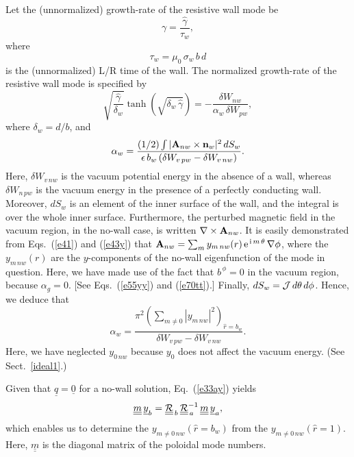 \documentclass[12pt,prb,aps]{revtex4-1}
\begin{document}
 Let the (unnormalized) 
 growth-rate of the resistive wall mode be
 \begin{equation}
 \gamma= \frac{\hat{\gamma}}{\tau_w},
 \end{equation}
 where
 \begin{equation}
 \tau_w = \mu_0\,\sigma_w\,b\,d
 \end{equation}
 is the (unnormalized) L/R time of the wall. 
 The normalized growth-rate of the resistive wall mode is specified by\,\cite{rwm4,rwm5}
 \begin{equation}\label{rwm}
 \sqrt{\frac{\hat{\gamma}}{\delta_w}}\tanh\left(\sqrt{\delta_w\,\hat{\gamma}}\right) = -\frac{\delta W_{nw}}{\alpha_w\,\delta W_{pw}},
 \end{equation}
 where $\delta_w=d/b$, 
and
 \begin{equation}
 \alpha_w = \frac{(1/2)\int|{\bf A}_{nw}\times {\bf n}_w|^2\,dS_w}{\epsilon\,b_w\,(\delta W_{v\,pw}- \delta W_{v\,nw})}.
 \end{equation}
 Here, $\delta W_{v\,nw}$ is the vacuum potential energy in the absence of a wall, whereas $\delta W_{n\,pw}$ is the vacuum energy in the presence of a
 perfectly conducting wall. 
 Moreover, $dS_w$ is an element of the inner  surface of the wall, and the integral is over the whole inner surface. Furthermore,
 the perturbed magnetic field in the vacuum region, in the no-wall case, is written $\nabla\times {\bf A}_{nw}$. 
 It is easily demonstrated from Eqs.~(\ref{e41}) and (\ref{e43y}) that ${\bf A}_{nw}= \sum_{m} y_{m\,nw}(r)\,{\rm e}^{\,{\rm i}\,m\,\theta}\,\nabla\phi$,
 where the $y_{m\,nw}(r)$ are the $y$-components of the no-wall eigenfunction of the mode in question. Here, we have made use of the fact that $b^{\,\phi}=0$
 in the vacuum region, because $\alpha_g=0$. [See Eqs.~(\ref{e55yy}) and (\ref{e70tt}).]
  Finally, $dS_w= {\cal J}\,d\theta\,d\phi$. 
 Hence, we deduce that
 \begin{equation}\label{alphaw}
 \alpha_w = \frac{\pi^2\left(\sum_{m\neq 0} |y_{m\,nw}|^2\right)_{\hat{r}=b_w}}{\delta W_{v\,pw}- \delta W_{v\,nw}}.
 \end{equation}
 Here, we have neglected $y_{0\,nw}$ because $y_0$ does not affect the vacuum energy. (See Sect.~\ref{ideal1}.)
 
 Given that $\underline{q}=\underline{0}$ for a no-wall solution, Eq.~(\ref{e33ay}) yields  
 \begin{equation}
\underline{\underline{m}}\, \underline{y}_b = \underline{\underline{\cal R}}_{\,b}\,\underline{\underline{\cal R}}_{\,a}^{-1}\,\underline{\underline{m}}\,\underline{y}_a,
\end{equation}
which enables us to determine the $y_{m\neq 0\,nw}(\hat{r}=b_w)$ from the $y_{m\neq 0\,nw}(\hat{r}=1)$. Here, $\underline{\underline{m}}$ is the diagonal matrix of the poloidal
mode numbers. 
\end{document}
